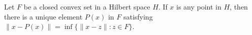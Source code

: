 Let $F$ be a closed convex set in a Hilbert space $H$. If $x$ is any point in $H$, then there is a unique element $P(x)$ in $F$ satisfying $\|x - P(x)\| = \inf \{ \|x - z\| : z \in F \}$.
